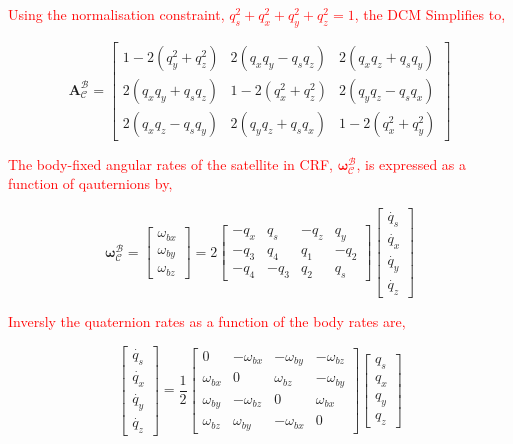 \textcolor{red}{Using the normalisation constraint, $q_s^2 + q_x^2 + q_y^2 + q_z^2 = 1$, the DCM Simplifies to,}

\begin{equation}
    \mathbf{A}_{\mathcal{C}}^{\mathcal{B}} = 
    \begin{bmatrix}
    1 - 2(q_y^2 + q_z^2) & 2(q_x q_y - q_s q_z) & 2(q_x q_z + q_s q_y) \\
    2(q_x q_y + q_s q_z) & 1 - 2(q_x^2 + q_z^2) & 2(q_y q_z - q_s q_x) \\
    2(q_x q_z - q_s q_y) & 2(q_y q_z + q_s q_x) & 1 - 2(q_x^2 + q_y^2)   
    \end{bmatrix}
\end{equation}

\textcolor{red}{The body-fixed angular rates of the satellite in CRF, $\mathbf{\omega}_{\mathcal{C}}^{\mathcal{B}}$, is expressed as a function of qauternions by,}

\begin{equation}
    \mathbf{\omega}_{\mathcal{C}}^{\mathcal{B}} = 
    \begin{bmatrix}
        \omega_{bx} \\ \omega_{by} \\ \omega_{bz}
    \end{bmatrix}
    = 2
    \begin{bmatrix}
       -q_x & q_s & -q_z & q_y \\
       -q_3 & q_4 & q_1 & -q_2 \\
       -q_4 & -q_3 & q_2 & q_s 
    \end{bmatrix}
    \begin{bmatrix}
        \dot{q_s} \\ \dot{q_x} \\ \dot{q_y} \\ \dot{q_z}
    \end{bmatrix}
\end{equation}

\textcolor{red}{Inversly the quaternion rates as a function of the body rates are,}

\begin{equation}
    \begin{bmatrix}
        \dot{q_s} \\ \dot{q_x} \\ \dot{q_y} \\ \dot{q_z}
    \end{bmatrix}
    =
    \frac{1}{2}
    \begin{bmatrix}
        0 & -\omega_{bx} & -\omega_{by} & -\omega_{bz}\\
        \omega_{bx} & 0 & \omega_{bz} & -\omega_{by}\\
        \omega_{by} & -\omega_{bz} & 0 & \omega_{bx}\\
        \omega_{bz} & \omega_{by} & -\omega_{bx} & 0 
    \end{bmatrix}
    \begin{bmatrix}
        q_s \\ q_x \\ q_y \\ q_z
    \end{bmatrix}
\end{equation}

